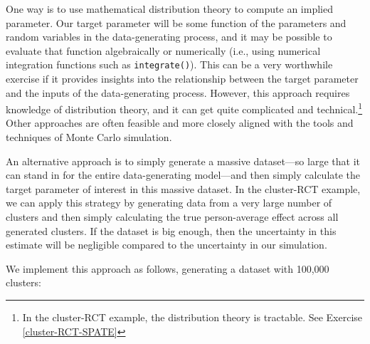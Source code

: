 \documentclass[
]{book}
\newenvironment{Shaded}{\begin{snugshade}}{\end{snugshade}}
\newcommand{\AttributeTok}[1]{\textcolor[rgb]{0.13,0.29,0.53}{#1}}
\newcommand{\DecValTok}[1]{\textcolor[rgb]{0.00,0.00,0.81}{#1}}
\newcommand{\FloatTok}[1]{\textcolor[rgb]{0.00,0.00,0.81}{#1}}
\newcommand{\FunctionTok}[1]{\textcolor[rgb]{0.13,0.29,0.53}{\textbf{#1}}}
\newcommand{\NormalTok}[1]{#1}
\newcommand{\OtherTok}[1]{\textcolor[rgb]{0.56,0.35,0.01}{#1}}
\newcommand{\SpecialCharTok}[1]{\textcolor[rgb]{0.81,0.36,0.00}{\textbf{#1}}}
\begin{document}
One way is to use mathematical distribution theory to compute an implied parameter.
Our target parameter will be some function of the parameters and random variables in the data-generating process, and it may be possible to evaluate that function algebraically or numerically (i.e., using numerical integration functions such as \texttt{integrate()}).
This can be a very worthwhile exercise if it provides insights into the relationship between the target parameter and the inputs of the data-generating process.
However, this approach requires knowledge of distribution theory, and it can get quite complicated and technical.\footnote{In the cluster-RCT example, the distribution theory is tractable. See Exercise \ref{cluster-RCT-SPATE}}
Other approaches are often feasible and more closely aligned with the tools and techniques of Monte Carlo simulation.

An alternative approach is to simply generate a massive dataset---so large that it can stand in for the entire data-generating model---and then simply calculate the target parameter of interest in this massive dataset. In the cluster-RCT example, we can apply this strategy by generating data from a very large number of clusters and then simply calculating the true person-average effect across all generated clusters.
If the dataset is big enough, then the uncertainty in this estimate will be negligible compared to the uncertainty in our simulation.

We implement this approach as follows, generating a dataset with 100,000 clusters:

\begin{Shaded}
\end{Shaded}
\end{document}
